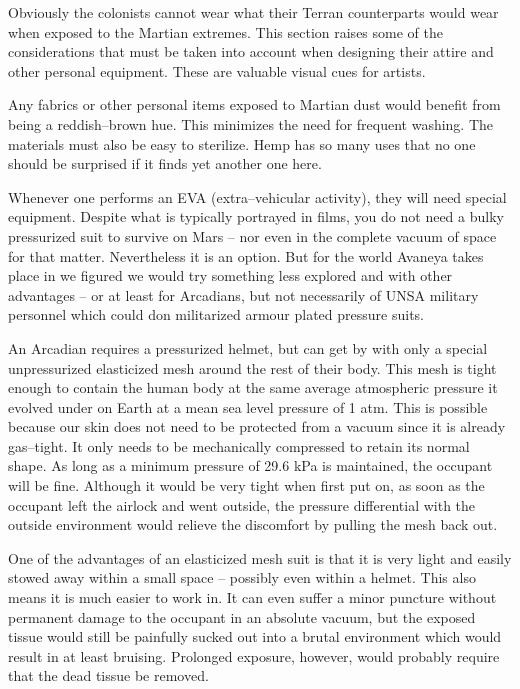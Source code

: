 

Obviously the colonists cannot wear what their Terran counterparts would wear when exposed to the Martian extremes. This section raises some of the considerations that must be taken into account when designing their attire and other personal equipment. These are valuable visual cues for artists.

Any fabrics or other personal items exposed to Martian dust would benefit from being a reddish--brown hue. This minimizes the need for frequent washing. The materials must also be easy to sterilize. Hemp has so many uses that no one should be surprised if it finds yet another one here.

Whenever one performs an EVA (extra--vehicular activity), they will need special equipment. Despite what is typically portrayed in films, you do not need a bulky pressurized suit to survive on Mars -- nor even in the complete vacuum of space for that matter. Nevertheless it is an option. But for the world Avaneya takes place in we figured we would try something less explored and with other advantages -- or at least for Arcadians, but not necessarily of UNSA military personnel which could don militarized armour plated pressure suits.

An Arcadian requires a pressurized helmet, but can get by with only a special unpressurized elasticized mesh around the rest of their body. This mesh is tight enough to contain the human body at the same average atmospheric pressure it evolved under on Earth at a mean sea level pressure of 1 atm. This is possible because our skin does not need to be protected from a vacuum since it is already gas--tight. It only needs to be mechanically compressed to retain its normal shape. As long as a minimum pressure of 29.6 kPa is maintained, the occupant will be fine. Although it would be very tight when first put on, as soon as the occupant left the airlock and went outside, the pressure differential with the outside environment would relieve the discomfort by pulling the mesh back out.

One of the advantages of an elasticized mesh suit is that it is very light and easily stowed away within a small space -- possibly even within a helmet. This also means it is much easier to work in. It can even suffer a minor puncture without permanent damage to the occupant in an absolute vacuum, but the exposed tissue would still be painfully sucked out into a brutal environment which would result in at least bruising. Prolonged exposure, however, would probably require that the dead tissue be removed.

